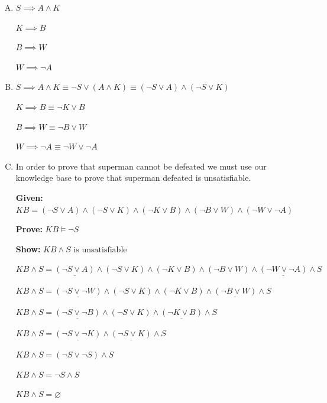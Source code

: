 \documentclass[10pt,a4paper]{article}
\begin{document}
	\begin{enumerate}[A.]	
	\item
	
	$S \implies A \land K$
	
	$K \implies B$
	
	$B \implies W$
	
	$W \implies \neg A$
	
	\item
	
	$S \implies A \land K \equiv \neg S \lor (A \land K) \equiv (\neg S \lor A) \land (\neg S \lor K)$
	
	$K \implies B \equiv \neg K \lor B$
	
	$B \implies W \equiv \neg B \lor W$
	
	$W \implies \neg A \equiv \neg W \lor \neg A$
	
	\item
	
	In order to prove that superman cannot be defeated we must use our knowledge base to prove that superman defeated is unsatisfiable.
	
	\textbf{Given:} $KB = (\neg S \lor A) \land (\neg S \lor K) \land (\neg K \lor B) \land (\neg B \lor W) \land (\neg W \lor \neg A)$
	
	\textbf{Prove:} $KB \vDash \neg S$
	
	\textbf{Show:} $KB \land S \text{ is unsatisfiable}$
	
	$KB \land S = \underline{(\neg S \lor A)} \land (\neg S \lor K) \land (\neg K \lor B) \land (\neg B \lor W) \land \underline{(\neg W \lor \neg A)} \land S$
	
	$KB \land S = \underline{(\neg S \lor \neg W)} \land (\neg S \lor K) \land (\neg K \lor B) \land \underline{(\neg B \lor W)} \land S$
	
	$KB \land S = \underline{(\neg S \lor \neg B)} \land (\neg S \lor K) \land \underline{(\neg K \lor B)} \land S$
	
	$KB \land S = \underline{(\neg S \lor \neg K)} \land \underline{(\neg S \lor K)} \land S$
	
	$KB \land S = (\neg S \lor \neg S) \land S$
	
	$KB \land S = \neg S \land S$
	
	$KB \land S = \varnothing$

	
	
	
	
	
	
	
	
	
	
	

	
	
	\end{enumerate}
	
\end{document}
